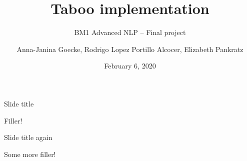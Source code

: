 \documentclass[11pt]{beamer}
\title{Taboo implementation}
\subtitle{BM1 Advanced NLP -- Final project}
\date{February 6, 2020}
\author{Anna-Janina Goecke, \newline Rodrigo Lopez Portillo Alcocer, \newline Elizabeth Pankratz \newline}
\institute{Universität Potsdam}
\begin{document}
	
\maketitle

\begin{frame}{Slide title}

Filler!

\end{frame}

\begin{frame}{Slide title again}
	
	Some more filler!
	
\end{frame}


%
%
%

\end{document}
